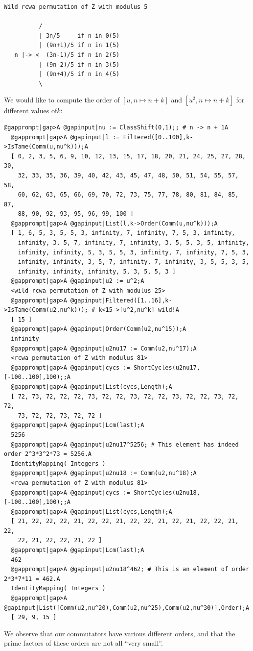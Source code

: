 \documentclass[a4paper,11pt]{report}
\begin{document}
{{\begin{Verbatim}[commandchars=!@A,fontsize=\small,frame=single,label=Example]
  Wild rcwa permutation of Z with modulus 5
  
          /
          | 3n/5     if n in 0(5)
          | (9n+1)/5 if n in 1(5)
   n |-> <  (3n-1)/5 if n in 2(5)
          | (9n-2)/5 if n in 3(5)
          | (9n+4)/5 if n in 4(5)
          \
\end{Verbatim}
 We would like to compute the order of $[u,n \mapsto n + k]$ and $[u^2,n \mapsto n + k]$ for different values of{\nobreakspace}$k$: 
\begin{Verbatim}[commandchars=@|A,fontsize=\small,frame=single,label=Example]
  @gapprompt|gap>A @gapinput|nu := ClassShift(0,1);; # n -> n + 1A
  @gapprompt|gap>A @gapinput|l := Filtered([0..100],k->IsTame(Comm(u,nu^k)));A
  [ 0, 2, 3, 5, 6, 9, 10, 12, 13, 15, 17, 18, 20, 21, 24, 25, 27, 28, 30, 
    32, 33, 35, 36, 39, 40, 42, 43, 45, 47, 48, 50, 51, 54, 55, 57, 58, 
    60, 62, 63, 65, 66, 69, 70, 72, 73, 75, 77, 78, 80, 81, 84, 85, 87, 
    88, 90, 92, 93, 95, 96, 99, 100 ]
  @gapprompt|gap>A @gapinput|List(l,k->Order(Comm(u,nu^k)));A
  [ 1, 6, 5, 3, 5, 5, 3, infinity, 7, infinity, 7, 5, 3, infinity, 
    infinity, 3, 5, 7, infinity, 7, infinity, 3, 5, 5, 3, 5, infinity, 
    infinity, infinity, 5, 3, 5, 5, 3, infinity, 7, infinity, 7, 5, 3, 
    infinity, infinity, 3, 5, 7, infinity, 7, infinity, 3, 5, 5, 3, 5, 
    infinity, infinity, infinity, 5, 3, 5, 5, 3 ]
  @gapprompt|gap>A @gapinput|u2 := u^2;A
  <wild rcwa permutation of Z with modulus 25>
  @gapprompt|gap>A @gapinput|Filtered([1..16],k->IsTame(Comm(u2,nu^k))); # k<15->[u^2,nu^k] wild!A
  [ 15 ]
  @gapprompt|gap>A @gapinput|Order(Comm(u2,nu^15));A
  infinity
  @gapprompt|gap>A @gapinput|u2nu17 := Comm(u2,nu^17);A
  <rcwa permutation of Z with modulus 81>
  @gapprompt|gap>A @gapinput|cycs := ShortCycles(u2nu17,[-100..100],100);;A
  @gapprompt|gap>A @gapinput|List(cycs,Length);A
  [ 72, 73, 72, 72, 72, 73, 72, 72, 73, 72, 72, 73, 72, 72, 73, 72, 72, 
    73, 72, 72, 73, 72, 72 ]
  @gapprompt|gap>A @gapinput|Lcm(last);A
  5256
  @gapprompt|gap>A @gapinput|u2nu17^5256; # This element has indeed order 2^3*3^2*73 = 5256.A
  IdentityMapping( Integers )
  @gapprompt|gap>A @gapinput|u2nu18 := Comm(u2,nu^18);A
  <rcwa permutation of Z with modulus 81>
  @gapprompt|gap>A @gapinput|cycs := ShortCycles(u2nu18,[-100..100],100);;A
  @gapprompt|gap>A @gapinput|List(cycs,Length);A
  [ 21, 22, 22, 22, 21, 22, 22, 21, 22, 22, 21, 22, 21, 22, 22, 21, 22, 
    22, 21, 22, 22, 21, 22 ]
  @gapprompt|gap>A @gapinput|Lcm(last);A
  462
  @gapprompt|gap>A @gapinput|u2nu18^462; # This is an element of order 2*3*7*11 = 462.A
  IdentityMapping( Integers )
  @gapprompt|gap>A @gapinput|List([Comm(u2,nu^20),Comm(u2,nu^25),Comm(u2,nu^30)],Order);A
  [ 29, 9, 15 ]
\end{Verbatim}
 We observe that our commutators have various different orders, and that the
prime factors of these orders are not all ``very small''. 

}}
\end{document}
